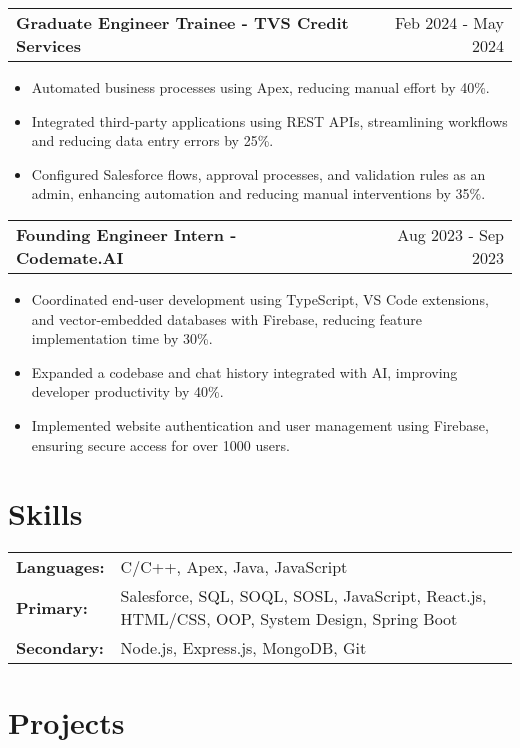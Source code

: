 \documentclass[a4paper,9pt]{article}
\makeatletter
\newenvironment{joblong}[2]
    {
    \begin{tabularx}{\linewidth}{@{}l X r@{}}
    \textbf{#1} & \hfill &  #2 \\[3.75pt]
    \end{tabularx}
    \begin{minipage}[t]{\linewidth}
    \begin{itemize}[nosep,after=\strut, leftmargin=1em, itemsep=3pt,label=--]
    }
    {
    \end{itemize}
    \end{minipage}    
    }
\makeatother
\begin{document}
\begin{joblong}{Graduate Engineer Trainee - TVS Credit Services}{Feb 2024 - May 2024} 
\item Automated business processes using Apex, reducing manual effort by 40\%.  
\item Integrated third-party applications using REST APIs, streamlining workflows and reducing data entry errors by 25\%.  
\item Configured Salesforce flows, approval processes, and validation rules as an admin, enhancing automation and reducing manual interventions by 35\%.  
\end{joblong}

\begin{joblong}{Founding Engineer Intern - Codemate.AI}{Aug 2023 - Sep 2023}
\item Coordinated end-user development using TypeScript, VS Code extensions, and vector-embedded databases with Firebase, reducing feature implementation time by 30\%.  
\item Expanded a codebase and chat history integrated with AI, improving developer productivity by 40\%.  
\item Implemented website authentication and user management using Firebase, ensuring secure access for over 1000 users.   
\end{joblong}

\section{Skills}
\begin{tabularx}{\linewidth}{@{}l X@{}}
\textbf{Languages:} &  \normalsize{C/C++, Apex, Java, JavaScript} \\
\textbf{Primary:}  &  \normalsize{Salesforce, SQL, SOQL, SOSL, JavaScript, React.js, HTML/CSS, OOP, System Design, Spring Boot} \\  
\textbf{Secondary:}  &  \normalsize{Node.js, Express.js, MongoDB, Git} \\
\end{tabularx}

\section{Projects}
\end{document}
